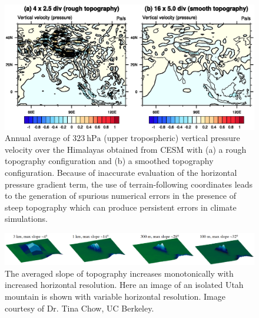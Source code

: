 \documentclass[11pt]{article}
\begin{document}
\begin{figure}[t]
\begin{center}
\includegraphics[width=5in, clip=true, trim=0cm 5.1cm 0cm 4.6cm]{OmegaNoise.eps}
\end{center}
\caption{Annual average of $323\ \mbox{hPa}$ (upper tropospheric) vertical pressure velocity over the Himalayas obtained from CESM with (a) a rough topography configuration and (b) a smoothed topography configuration. Because of inaccurate evaluation of the horizontal pressure gradient term, the use of terrain-following coordinates leads to the generation of spurious numerical errors in the presence of steep topography which can produce persistent errors in climate simulations.} \label{fig:OmegaNoise}
\end{figure}

\begin{figure}[t]
\begin{center}
\includegraphics[width=6.5in]{MountainSlopeResolutionLong.png}
\end{center}
\caption{The averaged slope of topography increases monotonically with increased horizontal resolution.  Here an image of an isolated Utah mountain is shown with variable horizontal resolution.  Image courtesy of Dr. Tina Chow, UC Berkeley.} \label{fig:MountainSlopeResolution}
\end{figure}


\end{document}
